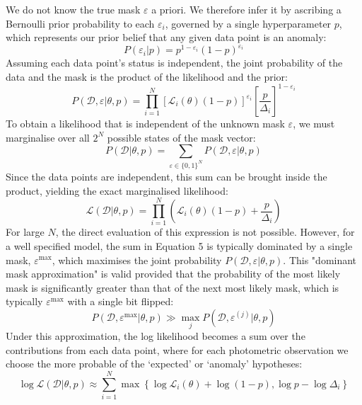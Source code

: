 We do not know the true mask $\varepsilon$ a priori. We therefore infer it by ascribing a Bernoulli prior probability to each $\varepsilon_i$, governed by a single hyperparameter $p$, which represents our prior belief that any given data point is an anomaly:
\begin{equation}
    P(\varepsilon_i | p) = p^{1-\varepsilon_i} (1-p)^{\varepsilon_i}
\end{equation}
Assuming each data point's status is independent, the joint probability of the data and the mask is the product of the likelihood and the prior:
\begin{equation}
    P(\mathcal{D}, \varepsilon | \theta, p) = \prod_{i=1}^{N} \left[ \mathcal{L}_i(\theta)(1-p) \right]^{\varepsilon_i} \left[ \frac{p}{\Delta_i} \right]^{1-\varepsilon_i}
\end{equation}
To obtain a likelihood that is independent of the unknown mask $\varepsilon$, we must marginalise over all $2^N$ possible states of the mask vector:
\begin{equation}
    P(\mathcal{D} | \theta, p) = \sum_{\varepsilon \in \{0,1\}^N} P(\mathcal{D}, \varepsilon | \theta, p)
\end{equation}
Since the data points are independent, this sum can be brought inside the product, yielding the exact marginalised likelihood:
\begin{equation}
\label{eq:marginalised_likelihood}
    \mathcal{L}(\mathcal{D}|\theta, p) = \prod_{i=1}^{N} \left( \mathcal{L}_i(\theta)(1-p) + \frac{p}{\Delta_i} \right)
\end{equation}
For large $N$, the direct evaluation of this expression is not possible. However, for a well specified model, the sum in Equation 5 is typically dominated by a single mask, $\varepsilon^\mathrm{max}$, which maximises the joint probability $P(\mathcal{D}, \varepsilon | \theta, p)$. This "dominant mask approximation" is valid provided that the probability of the most likely mask is significantly greater than that of the next most likely mask, which is typically $\varepsilon^\mathrm{max}$ with a single bit flipped:
\begin{equation}
    P(\mathcal{D}, \varepsilon^\mathrm{max} | \theta, p) \gg \max_{j} P(\mathcal{D}, \varepsilon^{(j)} | \theta, p)
\end{equation}
Under this approximation, the log likelihood becomes a sum over the contributions from each data point, where for each photometric observation we choose the more probable of the `expected' or `anomaly' hypotheses:
\begin{equation}
    \log \mathcal{L}(\mathcal{D}|\theta, p) \approx \sum_{i=1}^{N} \max \left\{ \log\mathcal{L}_i(\theta) + \log(1-p), \log p - \log\Delta_i \right\}
\end{equation}
